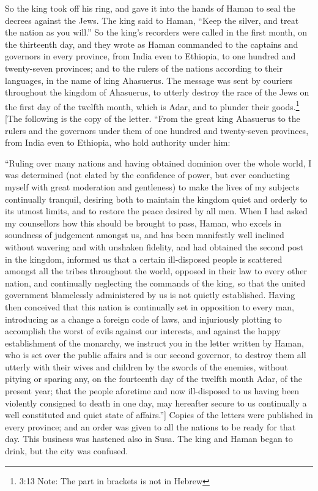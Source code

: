  So the king took off his ring, and gave it into the hands
of Haman to seal the decrees against the Jews.  The king
said to Haman, ``Keep the silver, and treat the nation as you will.''
 So the king's recorders were called in the first month, on
the thirteenth day, and they wrote as Haman commanded to the captains
and governors in every province, from India even to Ethiopia, to one
hundred and twenty-seven provinces; and to the rulers of the nations
according to their languages, in the name of king Ahasuerus.
 The message was sent by couriers throughout the kingdom of
Ahasuerus, to utterly destroy the race of the Jews on the first day of
the twelfth month, which is Adar, and to plunder their goods.\footnote{3:13
  Note: The part in brackets is not in Hebrew} {[}The following is the
copy of the letter. ``From the great king Ahasuerus to the rulers and
the governors under them of one hundred and twenty-seven provinces, from
India even to Ethiopia, who hold authority under him:

``Ruling over many nations and having obtained dominion over the whole
world, I was determined (not elated by the confidence of power, but ever
conducting myself with great moderation and gentleness) to make the
lives of my subjects continually tranquil, desiring both to maintain the
kingdom quiet and orderly to its utmost limits, and to restore the peace
desired by all men. When I had asked my counsellors how this should be
brought to pass, Haman, who excels in soundness of judgement amongst us,
and has been manifestly well inclined without wavering and with unshaken
fidelity, and had obtained the second post in the kingdom, informed us
that a certain ill-disposed people is scattered amongst all the tribes
throughout the world, opposed in their law to every other nation, and
continually neglecting the commands of the king, so that the united
government blamelessly administered by us is not quietly established.
Having then conceived that this nation is continually set in opposition
to every man, introducing as a change a foreign code of laws, and
injuriously plotting to accomplish the worst of evils against our
interests, and against the happy establishment of the monarchy, we
instruct you in the letter written by Haman, who is set over the public
affairs and is our second governor, to destroy them all utterly with
their wives and children by the swords of the enemies, without pitying
or sparing any, on the fourteenth day of the twelfth month Adar, of the
present year; that the people aforetime and now ill-disposed to us
having been violently consigned to death in one day, may hereafter
secure to us continually a well constituted and quiet state of
affairs.''{]}  Copies of the letters were published in
every province; and an order was given to all the nations to be ready
for that day.  This business was hastened also in Susa. The
king and Haman began to drink, but the city was confused.

